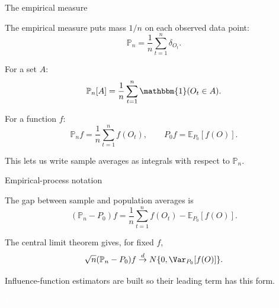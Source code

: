 \documentclass[xcolor={table}, handout]{beamer}
\begin{document}
\note{
\scriptsize \singlespacing

}
\begin{frame}{The empirical measure}

\begin{wideitemize}
\item The empirical measure puts mass $1/n$ on each observed data point:
\[
\mathbb{P}_n
  =
  \frac{1}{n}\sum_{t=1}^n \delta_{O_t}.
\]\pause
\item For a set $A$:
\[
\mathbb{P}_n[A]
  =
  \frac{1}{n}\sum_{t=1}^n \mathbbm{1}(O_t\in A).
\]\pause
\item For a function $f$:
\[
\mathbb{P}_n f
  =
  \frac{1}{n}\sum_{t=1}^n f(O_t),
\qquad
P_0 f
  =
  \mathbb{E}_{P_0}[f(O)].
\]\pause
\item This lets us write sample averages as integrals with respect to $\mathbb{P}_n$.
\end{wideitemize}

\end{frame}

\note{
\scriptsize \singlespacing

}
\begin{frame}{Empirical-process notation}

\begin{wideitemize}
\item The gap between sample and population averages is
\[
(\mathbb{P}_n-P_0)f
  =
  \frac{1}{n}\sum_{t=1}^n f(O_t)
  -
  \mathbb{E}_{P_0}[f(O)].
\]\pause
\item The central limit theorem gives, for fixed $f$,
\[
\sqrt{n}(\mathbb{P}_n-P_0)f
  \overset{d}{\rightarrow}
  N\{0,\Var_{P_0}[f(O)]\}.
\]\pause
\item Influence-function estimators are built so their leading term has this form.
\end{wideitemize}

\end{frame}

\note{
\scriptsize \singlespacing

}
\begin{transitionframe}
\centering

\LARGE \textcolor{white}{Model classes.}

\end{transitionframe}
\end{document}
